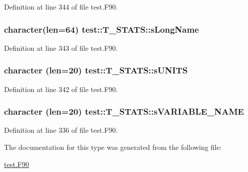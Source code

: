 Definition at line 344 of file test.F90.

\hypertarget{typetest_1_1_t___s_t_a_t_s_a2561ed6b521149afe2dbfd5d6ef33b27}{
\subsubsection[{sLongName}]{\setlength{\rightskip}{0pt plus 5cm}character(len=64) {\bf test::T\_\-STATS::sLongName}}}
\label{typetest_1_1_t___s_t_a_t_s_a2561ed6b521149afe2dbfd5d6ef33b27}


Definition at line 343 of file test.F90.

\hypertarget{typetest_1_1_t___s_t_a_t_s_a0240484711523e083bd3159282512b83}{
\subsubsection[{sUNITS}]{\setlength{\rightskip}{0pt plus 5cm}character (len=20) {\bf test::T\_\-STATS::sUNITS}}}
\label{typetest_1_1_t___s_t_a_t_s_a0240484711523e083bd3159282512b83}


Definition at line 342 of file test.F90.

\hypertarget{typetest_1_1_t___s_t_a_t_s_af379002e440a9bee2e2f48c545a5bc90}{
\subsubsection[{sVARIABLE\_\-NAME}]{\setlength{\rightskip}{0pt plus 5cm}character (len=20) {\bf test::T\_\-STATS::sVARIABLE\_\-NAME}}}
\label{typetest_1_1_t___s_t_a_t_s_af379002e440a9bee2e2f48c545a5bc90}


Definition at line 336 of file test.F90.



The documentation for this type was generated from the following file:\begin{DoxyCompactItemize}
\item 
\hyperlink{test_8_f90}{test.F90}\end{DoxyCompactItemize}
